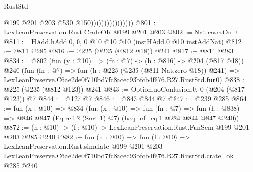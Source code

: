\begin{lexlean}{RustStd}
\begin{coremodule}
                                    @199
                                    @201
                                    @203
                                    @530
                                    @150))))))))))))))))
@801 := LexLeanPreservation.Rust.CrateOK @199 @201 @203
@802 := Nat.casesOn.{0}
@811 := HAdd.hAdd.{0, 0, 0} @10 @10 @10 (instHAdd.{0} @10 instAddNat)
@812 := @811 @285
@816 := @225 (@235 (@812 @18)) @241
@817 := @811 @283
@834 := @802
    (fun (y : @10) => (fn : @7) -> (h : @816) -> @204 (@817 @18))
    @240
    (fun (fn : @7) =>
    fun (h : @225 (@235 (@811 Nat.zero @18)) @241) =>
    LexLeanPreserve.C6ae2de0f710bd7fc8acec93bfcb4f876.R27.RustStd.fun0)
@838 := @225 (@235 (@812 @123)) @241
@843 := Option.noConfusion.{0, 0} (@204 (@817 @123)) @7
@844 := @127 @7
@846 := @843 @844 @7
@847 := @239 @285
@864 := fun (x : @10) =>
  @834
    (fun (x : @10) =>
    fun (fn : @7) =>
    fun (h : @838) => @846 @847 (Eq.refl.{2} (Sort 1) @7) (heq_of_eq.{1} @224 @844 @847 @240))
@872 := (n : @10) -> (f : @10) -> LexLeanPreservation.Rust.FunSem @199 @201 @203 @285 @240
@882 := fun (n : @10) =>
  fun (f : @10) =>
  LexLeanPreservation.Rust.simulate
    @199
    @201
    @203
    LexLeanPreserve.C6ae2de0f710bd7fc8acec93bfcb4f876.R27.RustStd.crate_ok
    @285
    @240
\end{coremodule}
\end{lexlean}
